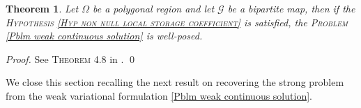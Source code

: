\documentclass[3p]{elsarticle}
\newtheorem{theorem}{Theorem}
\def\A{{\mathcal A}}
\def\V{\mathbf V}
\def\X{\mathbf X}
\def\Y{\mathbf Y}
\def\div{\bm{\nabla} \cdot}
\def\grad{\bm{\nabla}}
\def\Hdiv{\mathbf{H_{div}}}
\def\vone{\mathbf{v}_{1}}
\def\qtwo{q_{2}}
\def\rone{r_{1}}
\def\map{\mathcal{G} }%
\def\ind{\boldsymbol{\mathbbm{1}}}
\begin{document}
\begin{theorem}\label{Th Well Posedness Problem}
Let $\Omega$ be a polygonal region and let $\map$ be a bipartite map, then if the \textsc{Hypothesis \ref{Hyp non null local storage coefficient}} is satisfied, the \textsc{Problem} \eqref{Pblm weak continuous solution} is well-posed.
\end{theorem}
%
%
\begin{proof}
%
See \textsc{Theorem 4.8} in \cite{MoralesNaranjo}.
%
\qed
\end{proof}
%
%
We close this section recalling the next result on recovering the strong problem from the weak variational formulation \eqref{Pblm weak continuous solution}. 
\end{document}
